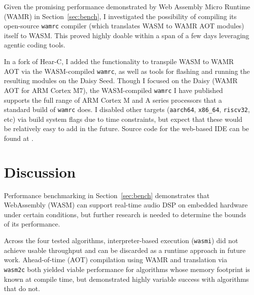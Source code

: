 \documentclass[a4paper]{article}
\begin{document}


Given the promising performance demonstrated by Web Assembly Micro Runtime (WAMR) in Section~\ref{sec:bench}, I investigated the possibility of compiling its open-source \lstinline{wamrc} compiler (which translates WASM to WAMR AOT modules) itself to WASM. This proved highly doable within a span of a few days leveraging agentic coding tools.


In a fork of Hear-C, I added the functionality to transpile WASM to WAMR AOT via the WASM-compiled \lstinline{wamrc}, as well as tools for flashing and running the resulting modules on the Daisy Seed. Though I focused on the Daisy (WAMR AOT for ARM Cortex M7), the WASM-compiled \lstinline{wamrc} I have published supports the full range of ARM Cortex M and A series processors that a standard build of \lstinline{wamrc} does. I disabled other targets (\lstinline{aarch64}, \lstinline{x86_64}, \lstinline{riscv32}, etc) via build system flags due to time constraints, but expect that these would be relatively easy to add in the future. Source code for the web-based IDE can be found at \cite{DaisyOnlinerepo}.

\section{ Discussion }


Performance benchmarking in Section~\ref{sec:bench} demonstrates that WebAssembly (WASM) can support real-time audio DSP on embedded hardware under certain conditions, but further research is needed to determine the bounds of its performance. 

Across the four tested algorithms, interpreter-based execution (\lstinline{wasmi}) did not achieve usable throughput and can be discarded as a runtime approach in future work. Ahead-of-time (AOT) compilation using WAMR and translation via \lstinline{wasm2c} both yielded viable performance for algorithms whose memory footprint is known at compile time, but demonstrated highly variable success with algorithms that do not. 
\end{document}
